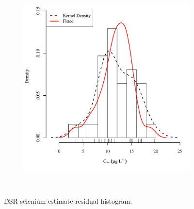 \begin{landscape}
\begin{figure}
\begin{subfigure}{0.7\textwidth}
			\includegraphics[width=\tableCustomSize]{"Figures/Results_DSR/Stochastic/Conc Model ResDist WIL"}
		\end{subfigure}\\
		\caption{DSR selenium estimate residual histogram.}
	\end{figure}
\end{landscape}

